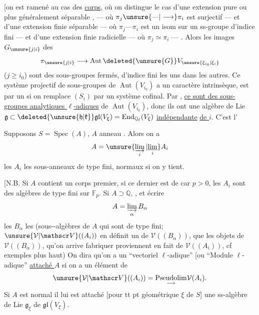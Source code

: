 [on est ramené au cas des \uline{corps}, où on distingue le cas d'une extension 
pure ou plus généralement séparable , --- où $\pi_j\unsure{\text{---}|\longrightarrow}\pi_i$ est surjectif --- et d'une extension finie séparable --- où $\pi_j\text{---}\pi_i$ est un isom sur un ss-groupe d'indice fini --- et d'une extension finie radicielle --- où $\pi_j\simeq\pi_i$ --- . Alors les images $G_{\unsure{j|i}}$ des
\[
\pi_{\unsure{j|i}}\longrightarrow\operatorname{Aut}\deleted{\unsure{G}}V_{\unsure{\xi_{i_0}|\xi_i}}
\]
($j\geq i_0$) sont des sous-groupes fermés,  d'indice fini les uns dans les autres. Ce système projectif de sous-groupes de $\operatorname{Aut}(V_{i_0})$  a un caractère intrinsèque, est  par un  si on remplace $(S_i)$ par un système cofinal. Par , \uline{ce sont des sous-groupes analytiques $\ell$-adiques} de $\operatorname{Aut}(V_{i_0})$, donc ils ont une algèbre de Lie $\mathfrak g\subset\deleted{\unsure{\mathfrak h|\mathfrak k}}\mathfrak{gl}(V_\xi)=\operatorname{End}_{\mathbb Q_\ell}(V_\xi)$ \uline{indépendante}
\uline{de $i$}.  C'est l'

Supposons $S=\operatorname{Spec}(A)$, $A$ anneau   . Alors on a
\[
A=\unsure{\varinjlim_i|\underset{i}{\underline{\lim}}}A_i
\]
les $A_i$ les sous-anneaux de type fini,  normaux  si on y tient.

[N.B.  Si $A$ contient un corps premier, si ce dernier est de car $p>0$, les $A_i$ sont des algèbres de type fini sur $\mathbb F_p$. Si $A\supset\mathbb Q$,  , et écrire
\[
A=\varinjlim_\alpha B_\alpha
\]
les $B_\alpha$ les (sous--algèbres de $A$ qui sont de type fini;   $\unsure{\mathcal V|\mathscr V}((A_i))$ en définit un de $\mathcal V((B_\alpha))$,  que les objets  de $\mathcal V((B_\alpha))$, qu'on arrive  fabriquer proviennent en fait de $\mathcal V((A_i))$, cf exemples plus haut) On dira
qu'on a un  ``vectoriel $\ell$-adique'' [ou ``Module $\ell$-adique''\unsure{)|]} \uline{attaché  $A$} si on a un élément de
\[
\unsure{\mathcal V|\mathscr V}((A_i))=\underset{\longrightarrow}{\operatorname{Pseudolim}}\mathcal V(A_i).
\]
Si $A$ est normal  il lui est attaché   [pour tt pt géométrique $\xi$ de $S$] une ss-algèbre de Lie $\mathfrak g_\xi$ de $\mathfrak{gl}(V_\xi)$.

